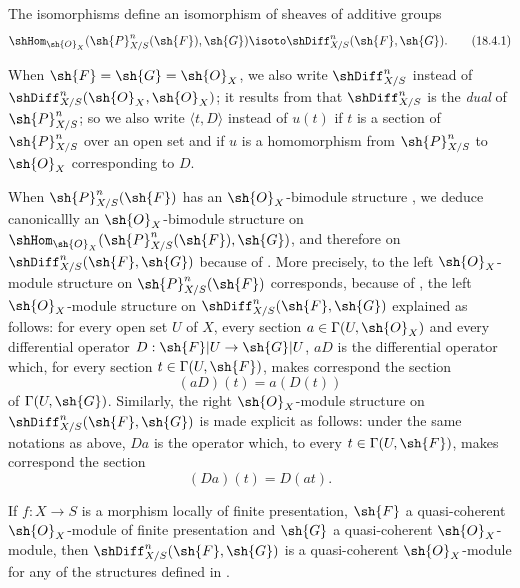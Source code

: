 \begin{proposition}[16.8.4]
\label{IV.16.8.4}
The isomorphisms  define an isomorphism of sheaves of additive groups
\[
  \label{IV.16.8.4.1}
  \shHom_{\sh{O}_X}(\sh{P}_{X/S}^n(\sh{F}), \sh{G}) \isoto \shDiff_{X/S}^n(\sh{F}, \sh{G}).
  \tag{18.4.1}
\]
\end{proposition}

When $\sh{F} = \sh{G} = \sh{O}_X$, we also write $\shDiff_{X/S}^n$ instead of $\shDiff_{X/S}^n(\sh{O}_X, \sh{O}_X)$;
it results from  that $\shDiff_{X/S}^n$ is the \emph{dual} of $\sh{P}_{X/S}^n$;
so we also write $\langle t, D \rangle$ instead of $u(t)$ if $t$ is a section of $\sh{P}_{X/S}^n$ over an open set and if $u$ is a homomorphism from $\sh{P}_{X/S}^n$ to $\sh{O}_X$ corresponding to $D$.

\begin{env}[16.8.5]
\label{IV.16.8.5}
When $\sh{P}_{X/S}^n(\sh{F})$ has an $\sh{O}_X$-bimodule structure , we deduce canonicallly an $\sh{O}_X$-bimodule structure on $\shHom_{\sh{O}_X}(\sh{P}_{X/S}^n(\sh{F}), \sh{G})$, and therefore on $\shDiff_{X/S}^n(\sh{F}, \sh{G})$ because of .
More precisely, to the left $\sh{O}_X$-module structure on $\sh{P}_{X/S}^n(\sh{F})$ corresponds, because of , the left $\sh{O}_X$-module structure on $\shDiff_{X/S}^n(\sh{F}, \sh{G})$ explained as follows:
for every open set $U$ of $X$, every section $a \in \Gamma(U, \sh{O}_X)$ and every differential operator $D: \sh{F}|U \to \sh{G}|U$, $aD$ is the differential operator which, for every section $t \in \Gamma(U, \sh{F})$, makes correspond the section
\[
  \label{IV.16.8.5.1}
  (aD)(t) = a(D(t))
  \tag{16.8.5.1}
\]
of $\Gamma(U, \sh{G})$.
Similarly, the right $\sh{O}_X$-module structure on $\shDiff_{X/S}^n(\sh{F}, \sh{G})$ is made explicit as follows:
under the same notations as above, $Da$ is the operator which, to every $t \in \Gamma(U, \sh{F})$, makes correspond the section
\[
  \label{IV.16.8.5.2}
  (Da)(t) = D(at).
  \tag{16.8.5.2}
\]
\end{env}

\begin{proposition}[16.8.6]
\label{IV.16.8.6}
If $f:X \to S$ is a morphism locally of finite presentation, $\sh{F}$ a quasi-coherent $\sh{O}_X$-module of finite presentation and $\sh{G}$ a quasi-coherent $\sh{O}_X$-module, then $\shDiff_{X/S}^n(\sh{F}, \sh{G})$ is a quasi-coherent $\sh{O}_X$-module for any of the structures defined in .
\end{proposition}

